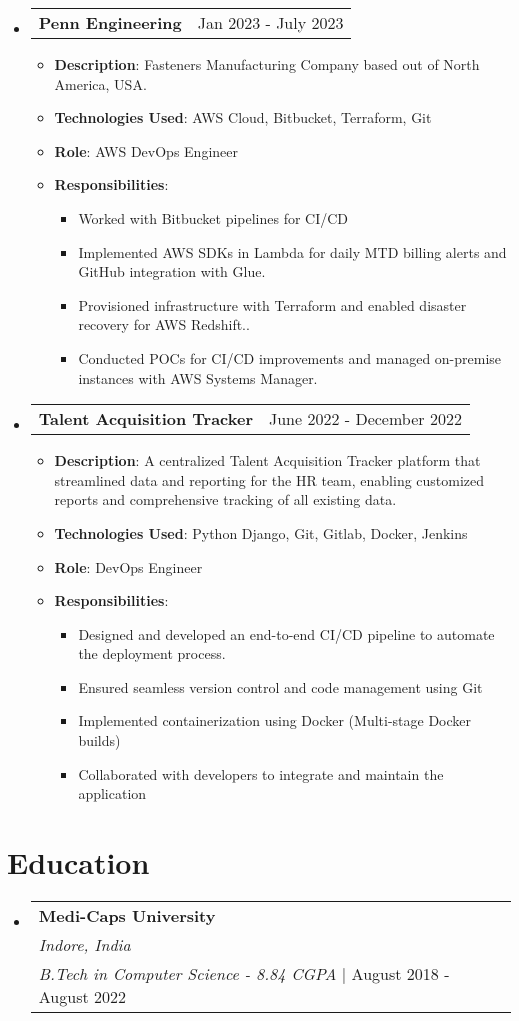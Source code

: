 \documentclass[a4paper,10pt]{article}
\makeatletter
\newcommand{\resumeItem}[1]{
  \item\small{
    {#1 \vspace{-2pt}}
  }
}
\newcommand{\resumeSubheading}[4]{
  \item
  \begin{tabular*}{\textwidth}{l}
    \textbf{#1} \\  %
    \textit{#2} \\  %
    \textit{#3} | #4 \\  %
  \end{tabular*}\vspace{-5pt}
}
\newcommand{\resumeProjectHeading}[2]{
  \item
  \begin{tabular*}{\textwidth}[t]{l@{\extracolsep{\fill}}r}
    \small\textbf{#1} & #2 \\
  \end{tabular*}
}
\newcommand{\resumeSubHeadingListStart}{\begin{itemize}[leftmargin=0.15in, label={}]}
\newcommand{\resumeSubHeadingListEnd}{\end{itemize}}
\newcommand{\resumeItemListStart}{\begin{itemize}}
\newcommand{\resumeItemListEnd}{\end{itemize}}
\makeatother
\begin{document}
\vspace{1 cm}

\resumeSubHeadingListStart
  \resumeProjectHeading
    {Penn Engineering }{Jan 2023 - July 2023}
    \resumeItemListStart
      \resumeItem{\textbf{Description}:  Fasteners Manufacturing Company based out of North America, USA.}
      \resumeItem{\textbf{Technologies Used}: AWS Cloud, Bitbucket, Terraform, Git}
      \resumeItem{\textbf{Role}: AWS DevOps Engineer}
      \resumeItem{\textbf{Responsibilities}:}
      \resumeItemListStart
        \resumeItem{Worked with Bitbucket pipelines for CI/CD}
        \resumeItem{Implemented AWS SDKs in Lambda for daily MTD billing alerts and GitHub integration with Glue.}
        \resumeItem{Provisioned infrastructure with Terraform and enabled disaster recovery for AWS Redshift..}
        \resumeItem{Conducted POCs for CI/CD improvements and managed on-premise instances with AWS Systems Manager.}
      \resumeItemListEnd
    \resumeItemListEnd
\resumeSubHeadingListEnd


\resumeSubHeadingListStart
  \resumeProjectHeading
    {Talent Acquisition Tracker }{June 2022 - December 2022}
    \resumeItemListStart
      \resumeItem{\textbf{Description}: A centralized Talent Acquisition Tracker platform that streamlined data and reporting for the HR team, enabling customized reports and comprehensive tracking of all existing data.}
      \resumeItem{\textbf{Technologies Used}: Python Django, Git, Gitlab, Docker, Jenkins}
      \resumeItem{\textbf{Role}: DevOps Engineer}
      \resumeItem{\textbf{Responsibilities}:}
      \resumeItemListStart
        \resumeItem{Designed and developed an end-to-end CI/CD pipeline to automate the deployment process.}
        \resumeItem{Ensured seamless version control and code management using Git}
        \resumeItem{Implemented containerization using Docker (Multi-stage Docker builds)}
        \resumeItem{Collaborated with developers to integrate and maintain the application}

      \resumeItemListEnd
    \resumeItemListEnd
\resumeSubHeadingListEnd


\section{Education}
\resumeSubHeadingListStart
  \resumeSubheading
    {Medi-Caps University}{Indore, India}
    {B.Tech in Computer Science - 8.84 CGPA}{August 2018 - August 2022}
\resumeSubHeadingListEnd
\end{document}

